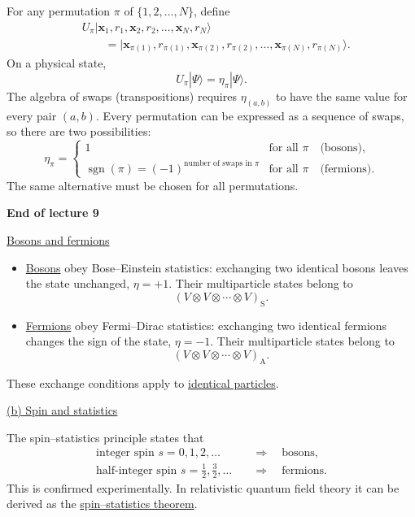 \documentclass[11pt,a4paper]{article}
\begin{document}
For any permutation $\pi$ of $\{1,2,\ldots,N\}$, define
\begin{align*}
    &U_\pi|\mathbf{x}_1,r_1,\mathbf{x}_2,r_2,\ldots,\mathbf{x}_N,r_N\rangle\\
    &\qquad=|\mathbf{x}_{\pi(1)},r_{\pi(1)},
        \mathbf{x}_{\pi(2)},r_{\pi(2)},\ldots,
        \mathbf{x}_{\pi(N)},r_{\pi(N)}\rangle.
\end{align*}
On a physical state,
\[
    U_\pi|\Psi\rangle=\eta_\pi|\Psi\rangle.
\]
The algebra of swaps (transpositions) requires $\eta_{(a,b)}$ to
have the same value for every pair $(a,b)$. Every permutation can
be expressed as a sequence of swaps, so there are two possibilities:
\[
    \eta_\pi=
    \begin{cases}
        1 & \text{for all }\pi\quad\text{(bosons)},\\[3pt]
        \operatorname{sgn}(\pi)=(-1)^{\text{number of swaps in }\pi}
          & \text{for all }\pi\quad\text{(fermions)}.
    \end{cases}
\]
The same alternative must be chosen for all permutations.

\begin{center}
    \textbf{End of lecture 9}
\end{center}
\noindent
\underline{Bosons and fermions}

\begin{itemize}
    \item \underline{Bosons} obey Bose--Einstein statistics: exchanging
    two identical bosons leaves the state unchanged, $\eta=+1$.
    Their multiparticle states belong to
    \[
        (V\otimes V\otimes\cdots\otimes V)_{\mathrm{S}}.
    \]
    \item \underline{Fermions} obey Fermi--Dirac statistics: exchanging
    two identical fermions changes the sign of the state, $\eta=-1$.
    Their multiparticle states belong to
    \[
        (V\otimes V\otimes\cdots\otimes V)_{\mathrm{A}}.
    \]
\end{itemize}
These exchange conditions apply to \underline{identical particles}.

\medskip
\noindent
\underline{(b) Spin and statistics}

The spin--statistics principle states that
\[
    \begin{aligned}
        \text{integer spin }s=0,1,2,\ldots
            &\quad\Longrightarrow\quad\text{bosons},\\
        \text{half-integer spin }s=\tfrac12,\tfrac32,\ldots
            &\quad\Longrightarrow\quad\text{fermions}.
    \end{aligned}
\]
This is confirmed experimentally. In relativistic quantum field theory
it can be derived as the \underline{spin--statistics theorem}.
\end{document}

